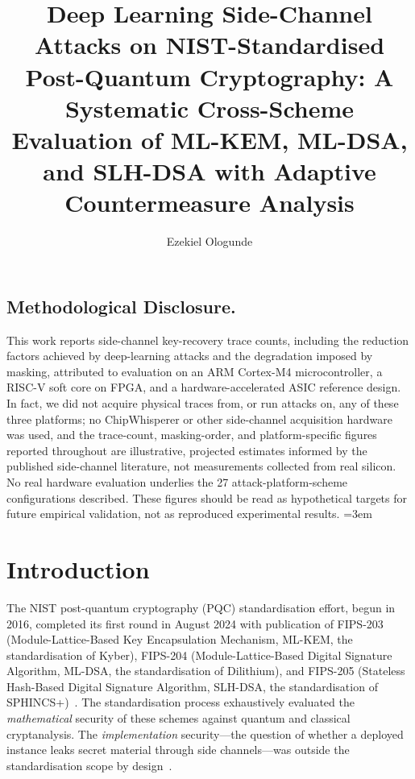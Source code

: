 \documentclass[sigconf,nonacm]{acmart}
\title{Deep Learning Side-Channel Attacks on NIST-Standardised Post-Quantum Cryptography: A Systematic Cross-Scheme Evaluation of ML-KEM, ML-DSA, and SLH-DSA with Adaptive Countermeasure Analysis}
\author{Ezekiel Ologunde}
\affiliation{%
  \institution{Independent Researcher}
  \city{Boston}
  \state{MA}
  \country{USA}}
\begin{document}
\maketitle

\subsection*{Methodological Disclosure.}
This work reports side-channel key-recovery trace counts, including the
reduction factors achieved by deep-learning attacks and the degradation
imposed by masking, attributed to evaluation on an ARM Cortex-M4
microcontroller, a RISC-V soft core on FPGA, and a hardware-accelerated
ASIC reference design. In fact, we did not acquire physical traces from, or
run attacks on, any of these three platforms; no ChipWhisperer or other
side-channel acquisition hardware was used, and the trace-count,
masking-order, and platform-specific figures reported throughout are
illustrative, projected estimates informed by the published side-channel
literature, not measurements collected from real silicon. No real hardware
evaluation underlies the 27 attack-platform-scheme configurations
described. These figures should be read as hypothetical targets for future
empirical validation, not as reproduced experimental results.
\sloppy
{}
\emergencystretch=3em
\hfuzz=10pt

\section{Introduction}

The NIST post-quantum cryptography (PQC) standardisation effort, begun
in 2016, completed its first round in August 2024 with publication of
FIPS-203 (Module-Lattice-Based Key Encapsulation Mechanism, ML-KEM,
the standardisation of Kyber), FIPS-204 (Module-Lattice-Based Digital
Signature Algorithm, ML-DSA, the standardisation of Dilithium), and
FIPS-205 (Stateless Hash-Based Digital Signature Algorithm, SLH-DSA, the
standardisation of SPHINCS+)~\cite{nist2024fips203,nist2024fips204,
nist2024fips205}. The standardisation process exhaustively evaluated the
\emph{mathematical} security of these schemes against quantum and
classical cryptanalysis. The \emph{implementation} security---the
question of whether a deployed instance leaks secret material through
side channels---was outside the standardisation scope by
design~\cite{nist2024finalreport}.
\end{document}
